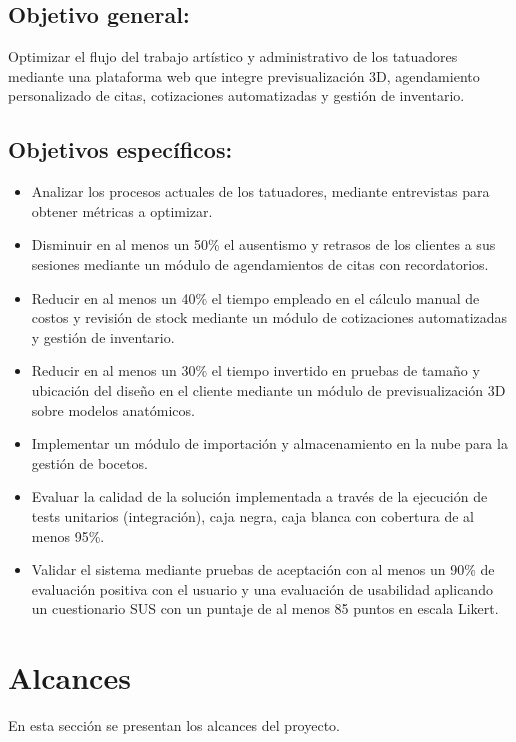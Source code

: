 \subsection{Objetivo general:}

Optimizar el flujo del trabajo artístico y administrativo de los tatuadores mediante una plataforma web que integre previsualización 3D, agendamiento personalizado de citas, cotizaciones automatizadas y gestión de inventario.

\vspace{\parskip}
\subsection{Objetivos específicos:}

\begin{itemize}
  \item Analizar los procesos actuales de los tatuadores, mediante entrevistas para obtener métricas a optimizar.
  \item Disminuir en al menos un 50\% el ausentismo y retrasos de los clientes a sus sesiones mediante un módulo de agendamientos de citas con recordatorios.
  \item Reducir en al menos un 40\% el tiempo empleado en el cálculo manual de costos y revisión de stock mediante un módulo de cotizaciones automatizadas y gestión de inventario.
  \item Reducir en al menos un 30\% el tiempo invertido en pruebas de tamaño y ubicación del diseño en el cliente mediante un módulo de previsualización 3D sobre modelos anatómicos.
  \item Implementar un módulo de importación y almacenamiento en la nube para la gestión de bocetos.
  \item Evaluar la calidad de la solución implementada a través de la ejecución de tests unitarios (integración), caja negra, caja blanca con cobertura de al menos 95\%.
  \item Validar el sistema mediante pruebas de aceptación con al menos un 90\% de evaluación positiva con el usuario y una evaluación de usabilidad aplicando un cuestionario SUS con un puntaje de al menos 85 puntos en escala Likert.
\end{itemize}

\section{Alcances}

En esta sección se presentan los alcances del proyecto.

